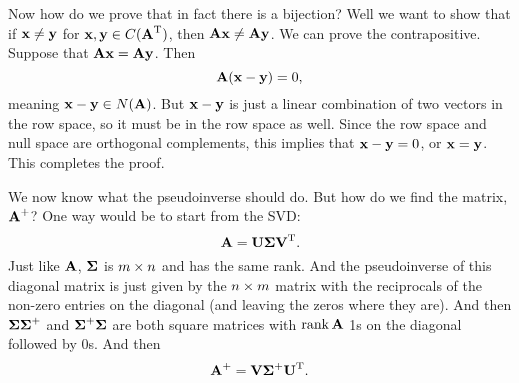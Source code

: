 Now how do we prove that in fact there is a bijection? Well we want to show that if $\vx \ne \vy$ for $\vx,\vy \in C(\T\mA)$, then $\mA\vx \ne \mA\vy$. We can prove the contrapositive. Suppose that $\mA\vx = \mA\vy$. Then
\[ \mA(\vx-\vy) = 0, \]
meaning $\vx - \vy \in N(\mA)$. But $\vx - \vy$ is just a linear combination of two vectors in the row space, so it must be in the row space as well. Since the row space and null space are orthogonal complements, this implies that $\vx - \vy = 0$, or $\vx = \vy$. This completes the proof.

We now know what the pseudoinverse should do. But how do we find the matrix, $\mA^+$? One way would be to start from the SVD:
\[ \mA = \mU\mSg\T\mV. \]
Just like $\mA$, $\mSg$ is $m \by n$ and has the same rank. And the pseudoinverse of this diagonal matrix is just given by the $n \by m$ matrix with the reciprocals of the non-zero entries on the diagonal (and leaving the zeros where they are). And then $\mSg\mSg^+ $ and $\mSg^+\mSg$ are both square matrices with $\Rank \mA$ 1s on the diagonal followed by 0s. And then
\[ \mA^+ = \mV\mSg^+\T\mU. \]